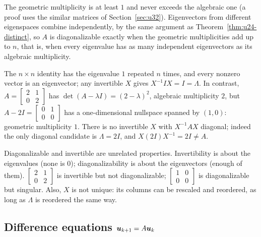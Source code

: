 The geometric multiplicity is at least $1$ and never exceeds the algebraic one (a proof uses
the similar matrices of Section~\ref{sec:u32}). Eigenvectors from different eigenspaces
combine independently, by the same argument as Theorem~\ref{thm:u24-distinct}, so $A$ is
diagonalizable exactly when the geometric multiplicities add up to $n$, that is, when every
eigenvalue has as many independent eigenvectors as its algebraic multiplicity.

\begin{example}\label{ex:u24-repeated}
The $n\times n$ identity has the eigenvalue $1$ repeated $n$ times, and every nonzero vector
is an eigenvector; any invertible $X$ gives $X^{-1}IX=I=\Lambda$. In contrast,
$A=\left[\begin{smallmatrix} 2&1\\ 0&2\end{smallmatrix}\right]$ has
$\det(A-\lambda I)=(2-\lambda)^{2}$, algebraic multiplicity $2$, but
$A-2I=\left[\begin{smallmatrix} 0&1\\ 0&0\end{smallmatrix}\right]$ has a one-dimensional
nullspace spanned by $(1,0)$: geometric multiplicity $1$. There is no invertible $X$ with
$X^{-1}AX$ diagonal; indeed the only diagonal candidate is $\Lambda=2I$, and
$X(2I)X^{-1}=2I\neq A$.
\end{example}

\begin{trap}
Diagonalizable and invertible are unrelated properties. Invertibility is about the
eigenvalues (none is $0$); diagonalizability is about the eigenvectors (enough of them).
$\left[\begin{smallmatrix} 2&1\\ 0&2\end{smallmatrix}\right]$ is invertible but not
diagonalizable; $\left[\begin{smallmatrix} 1&0\\ 0&0\end{smallmatrix}\right]$ is
diagonalizable but singular. Also, $X$ is not unique: its columns can be rescaled and
reordered, as long as $\Lambda$ is reordered the same way.
\end{trap}

\subsection{Difference equations \texorpdfstring{\(\boldsymbol{u}_{k+1}=A\boldsymbol{u}_k\)}{u(k+1) = A u(k)}}

